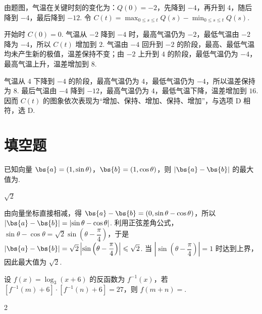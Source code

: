\begin{solution}
由题图，气温在关键时刻的变化为：\(Q(0)=-2\)，先降到 \(-4\)，再升到 \(4\)，随后降到 \(-4\)，最后降到 \(-12\). 令 \(C(t)=\max_{0\leqslant s\leqslant t}Q(s)-\min_{0\leqslant s\leqslant t}Q(s)\).

开始时 \(C(0)=0\). 气温从 \(-2\) 降到 \(-4\) 时，最高气温仍为 \(-2\)，最低气温由 \(-2\) 降为 \(-4\)，所以 \(C(t)\) 增加到 \(2\). 气温由 \(-4\) 回升到 \(-2\) 的阶段，最高、最低气温均未产生新的极值，温差保持不变；由 \(-2\) 上升到 \(4\) 的阶段，最低气温仍为 \(-4\)，最高气温上升，温差增加到 \(8\).

气温从 \(4\) 下降到 \(-4\) 的阶段，最高气温仍为 \(4\)，最低气温仍为 \(-4\)，所以温差保持为 \(8\). 最后气温由 \(-4\) 降到 \(-12\)，最高气温仍为 \(4\)，最低气温下降，温差增加到 \(16\). 因而 \(C(t)\) 的图象依次表现为“增加、保持、增加、保持、增加”，与选项 D 相符，选 D.
\end{solution}

\section{填空题}
\begin{problem}
已知向量 \(\bs{a} = (1, \sin \theta)\)，\(\bs{b} = (1, \cos \theta)\)，则 \(\left|\bs{a} - \bs{b}\right|\) 的最大值为\fillinblank{}.
\end{problem}

\begin{answer}
\(\sqrt{2}\)
\end{answer}

\begin{solution}
由向量坐标直接相减，得 \(\bs{a}-\bs{b}=(0,\sin\theta-\cos\theta)\)，所以 \(\left|\bs{a}-\bs{b}\right|=\left|\sin\theta-\cos\theta\right|\). 利用正弦差角公式，\(\sin\theta-\cos\theta=\sqrt{2}\sin\left(\theta-\dfrac{\pi}{4}\right)\)，于是 \(\left|\bs{a}-\bs{b}\right|=\sqrt{2}\left|\sin\left(\theta-\dfrac{\pi}{4}\right)\right|\leqslant\sqrt{2}\). 当 \(\left|\sin\left(\theta-\dfrac{\pi}{4}\right)\right|=1\) 时达到上界，因此最大值为 \(\sqrt{2}\).
\end{solution}

\begin{problem}
设 \( f(x) = \log_3(x + 6) \) 的反函数为 \( f^{-1}(x) \)，若 \( [f^{-1}(m) + 6]\cdot[f^{-1}(n) + 6] = 27 \)，则 \( f(m + n) = \)\fillinblank{}.
\end{problem}

\begin{answer}
2
\end{answer}

